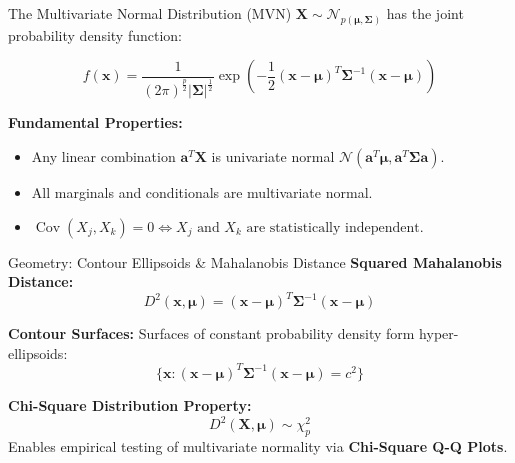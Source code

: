 \documentclass[aspectratio=169,ignorenonframetext]{beamer}
\begin{document}
\begin{frame}{The Multivariate Normal Distribution (MVN)}
\(\mathbf{X} \sim \mathcal{N}_{p\left( \mathbf{\mu},\mathbf{\Sigma} \right)}\)
has the joint probability density function:

\[f\left( \mathbf{x} \right) = \frac{1}{(2\pi)^{\frac{p}{2}}|\mathbf{\Sigma}|^{\frac{1}{2}}}\exp( - \frac{1}{2}\left( \mathbf{x} - \mathbf{\mu} \right)^{T}\mathbf{\Sigma}^{- 1}\left( \mathbf{x} - \mathbf{\mu} \right))\]

\textbf{Fundamental Properties:}

\begin{itemize}
\item
  Any linear combination \(\mathbf{a}^{T}\mathbf{X}\) is univariate
  normal
  \(\mathcal{N}(\mathbf{a}^{T}\mathbf{\mu},\mathbf{a}^{T}\mathbf{\Sigma}\mathbf{a})\).
\item
  All marginals and conditionals are multivariate normal.
\item
  \(\operatorname{Cov}(X_{j},X_{k}) = 0 \Longleftrightarrow X_{j}\text{  and  }X_{k}\text{  are statistically independent}\).
\end{itemize}
\end{frame}

\begin{frame}{Geometry: Contour Ellipsoids \& Mahalanobis Distance}
\textbf{Squared Mahalanobis Distance:}
\[D^{2}\left( \mathbf{x},\mathbf{\mu} \right) = \left( \mathbf{x} - \mathbf{\mu} \right)^{T}\mathbf{\Sigma}^{- 1}\left( \mathbf{x} - \mathbf{\mu} \right)\]

\textbf{Contour Surfaces:} Surfaces of constant probability density form
hyper-ellipsoids:
\[\{\mathbf{x}:\left( \mathbf{x} - \mathbf{\mu} \right)^{T}\mathbf{\Sigma}^{- 1}\left( \mathbf{x} - \mathbf{\mu} \right) = c^{2}\}\]

\textbf{Chi-Square Distribution Property:}
\[D^{2}\left( \mathbf{X},\mathbf{\mu} \right) \sim \chi_{p}^{2}\]
Enables empirical testing of multivariate normality via
\textbf{Chi-Square Q-Q Plots}.
\end{frame}
\end{document}
